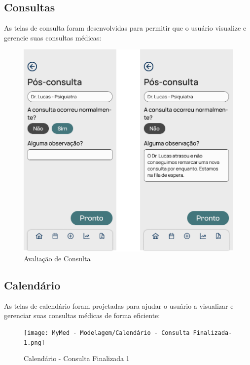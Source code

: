 \pagebreak

\subsection{Consultas}

As telas de consulta foram desenvolvidas para permitir que o usuário visualize e gerencie suas consultas médicas:

\begin{figure}[!htbp]
	\centering
	\includegraphics[width=1.0\linewidth]{MyMed - Modelagem/Avaliação Consulta.png}
	\caption{Avaliação de Consulta}
	\label{avaliacao_consulta}
\end{figure}

\subsection{Calendário}

As telas de calendário foram projetadas para ajudar o usuário a visualizar e gerenciar suas consultas médicas de forma eficiente:

\begin{figure}[!htbp]
	\centering
	\texttt{[image: MyMed - Modelagem/Calendário - Consulta Finalizada-1.png]}
	\caption{Calendário - Consulta Finalizada 1}
	\label{calendario_consulta_finalizada_1}
\end{figure}

